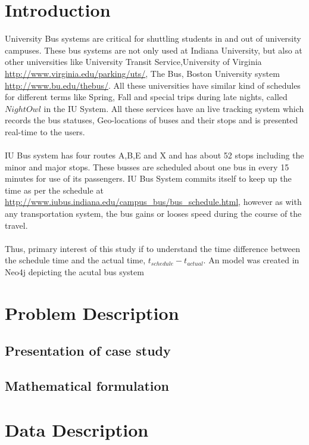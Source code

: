 \documentclass[12pt]{article}
\begin{document}
\clearpage

\tableofcontents
\clearpage

\section{Introduction}
University Bus systems are critical for shuttling students in and out of university campuses. These bus systems are not only used at Indiana University, but also at other universities like University Transit Service,University of Virginia \url{http://www.virginia.edu/parking/uts/}, The Bus, Boston University system \url{http://www.bu.edu/thebus/}. All these universities have similar kind of schedules for different terms like Spring, Fall and special trips during late nights, called $Night Owl$ in the IU System. All these services have an live tracking system which records the bus statuses, Geo-locations of buses and their stops and is presented real-time to the users.\\ \\
IU Bus system has four routes A,B,E and X and has about 52 stops including the minor and major stops. These busses are scheduled about one bus in every 15 minutes for use of its passengers. IU Bus System commits itself to keep up the time as per the schedule at \url{http://www.iubus.indiana.edu/campus_bus/bus_schedule.html}, however as with any transportation system, the bus gains or looses speed during the course of the travel. \\ \\
Thus, primary interest of this study if to understand the time difference between the schedule time and the actual time, $t_{schedule} - t_{actual}$. An model was created in Neo4j depicting the acutal bus system

\clearpage

\section{Problem Description}
\subsection{Presentation of case study}
\subsection{Mathematical formulation}
\section{Data Description}
\end{document}
